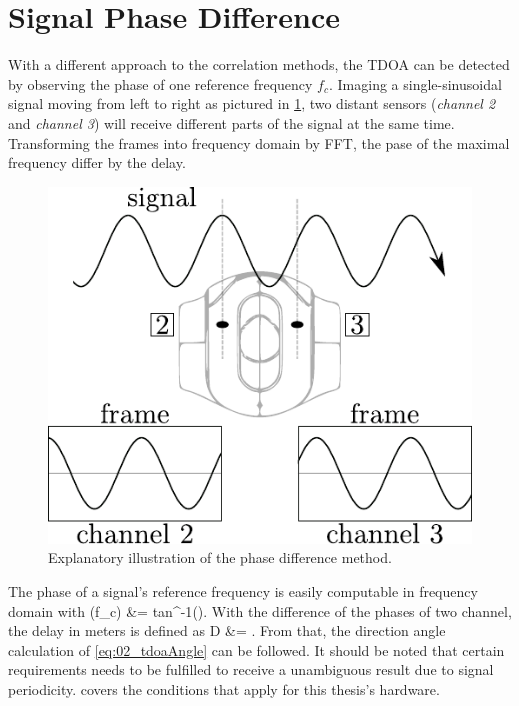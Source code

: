 \section{Signal Phase Difference}
\label{sec:02_phase}

With a different approach to the correlation methods, the \ac{TDOA} can be
detected by observing the phase of one reference frequency $f_c$.
Imaging a single-sinusoidal signal moving from left to right as
pictured in \cref{fig:02_phaseTheory}, two distant sensors
(\textit{channel 2} and \textit{channel 3}) will
receive different parts of the signal at the same time.
Transforming the frames into frequency domain by \ac{FFT}, the pase of the
maximal frequency differ by the delay.

\begin{figure}[ht]
	\centering
		\includegraphics[width=0.35\columnwidth]{figures/phase_theory}
	\caption{Explanatory illustration of the phase difference method.}
    \label{fig:02_phaseTheory}
\end{figure}

The phase of a signal's reference frequency is easily computable in frequency domain
with
\bal
    \phi(f_c) &= tan^{-1}\left(\right).
\eal
With the difference of the phases of two channel, the delay in meters is defined as
\bal
    D &= .
\eal
From that, the direction angle calculation of \cref{eq:02_tdoaAngle} can
be followed.
It should be noted that certain requirements needs to be fulfilled to receive a
unambiguous result due to signal periodicity.
 covers the conditions that apply for this thesis's
hardware.
